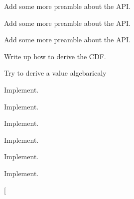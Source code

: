
\begin{DoxyRefList}
\item[\label{todo__todo000018}%
\hypertarget{todo__todo000018}{}%
Group \hyperlink{group__api}{api} ]Add some more preamble about the A\-P\-I.



Add some more preamble about the A\-P\-I.



Add some more preamble about the A\-P\-I.


\item[\label{todo__todo000001}%
\hypertarget{todo__todo000001}{}%
Global \hyperlink{_cube_8h_aa32dd25cda8601c7f6af2dbd096dc58c}{Cube\-Distance\-C\-D\-F} (double a, double $\ast$b)]Write up how to derive the C\-D\-F.  
\item[\label{todo__todo000002}%
\hypertarget{todo__todo000002}{}%
Global \hyperlink{_cube_8h_ac37d5ff3c99d8637fc414212ac041f18}{Cube\-Distance\-Var} (double $\ast$parameters)]Try to derive a value algebaricaly  
\item[\label{todo__todo000003}%
\hypertarget{todo__todo000003}{}%
Global \hyperlink{_cylinder_8h_a60d5666a2268964e3fff230e057e828a}{Cylinder\-Distance\-C\-D\-F} (double t, double $\ast$parameters)]Implement.  
\item[\label{todo__todo000004}%
\hypertarget{todo__todo000004}{}%
Global \hyperlink{_cylinder_8h_adf8f548d76cfc904e4a540e77c706f09}{Cylinder\-Distance\-Mean} (double $\ast$parameters)]Implement.  
\item[\label{todo__todo000005}%
\hypertarget{todo__todo000005}{}%
Global \hyperlink{_cylinder_8h_ab020730a65188640c7ead4a6bae27b14}{Cylinder\-Distance\-Var} (double $\ast$parameters)]Implement.  
\item[\label{todo__todo000006}%
\hypertarget{todo__todo000006}{}%
Global \hyperlink{_cylindrical_surface_8h_a545382429eb1caef4ad1b94ea081c5ff}{Cylindrical\-Surface\-Distance\-Mean} (double $\ast$parameters)]Implement.  
\item[\label{todo__todo000007}%
\hypertarget{todo__todo000007}{}%
Global \hyperlink{_cylindrical_surface_8h_a75ae68f76ede8f66bfae17c1de5b8e6e}{Cylindrical\-Surface\-Distance\-Var} (double $\ast$parameters)]Implement.  
\item[\label{todo__todo000008}%
\hypertarget{todo__todo000008}{}%
Global \hyperlink{_cylindrical_surface_geodesic_8h_a3dae4ac1d92551a685e6ea0faa08c3a4}{Cylindrical\-Surface\-Geodesic\-Distance\-C\-D\-F} (double t, double $\ast$parameters)]Implement.  
\item[\label{todo__todo000009}%

\end{DoxyRefList}
